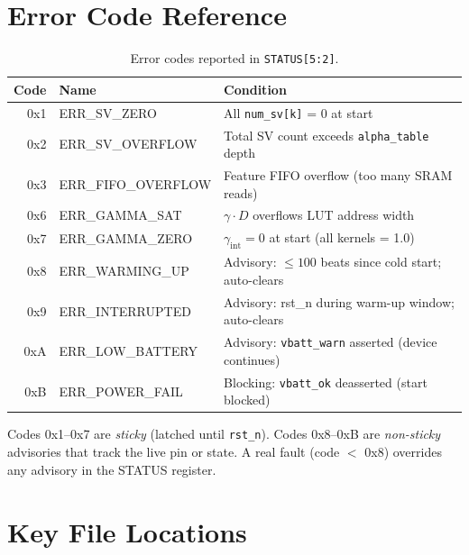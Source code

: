 \documentclass[11pt]{article}
\begin{document}
\section{Error Code Reference}

\begin{table}[H]
  \centering
  \caption{Error codes reported in \texttt{STATUS[5:2]}.}
  \label{tab:errcodes}
  \small
  \begin{tabular}{rll}
    \toprule
    Code & Name & Condition \\
    \midrule
    0x1 & ERR\_SV\_ZERO     & All \texttt{num\_sv[k]} = 0 at start \\
    0x2 & ERR\_SV\_OVERFLOW  & Total SV count exceeds \texttt{alpha\_table} depth \\
    0x3 & ERR\_FIFO\_OVERFLOW & Feature FIFO overflow (too many SRAM reads) \\
    0x6 & ERR\_GAMMA\_SAT   & $\gamma \cdot D$ overflows LUT address width \\
    0x7 & ERR\_GAMMA\_ZERO  & $\gamma_{\mathrm{int}} = 0$ at start (all kernels = 1.0) \\
    0x8 & ERR\_WARMING\_UP  & Advisory: $\le 100$ beats since cold start; auto-clears \\
    0x9 & ERR\_INTERRUPTED  & Advisory: rst\_n during warm-up window; auto-clears \\
    0xA & ERR\_LOW\_BATTERY & Advisory: \texttt{vbatt\_warn} asserted (device continues) \\
    0xB & ERR\_POWER\_FAIL  & Blocking: \texttt{vbatt\_ok} deasserted (start blocked) \\
    \bottomrule
  \end{tabular}
\end{table}

Codes 0x1--0x7 are \emph{sticky} (latched until \texttt{rst\_n}).  Codes 0x8--0xB
are \emph{non-sticky} advisories that track the live pin or state.  A real fault
(code $< $ 0x8) overrides any advisory in the STATUS register.

\appendix
\section{Key File Locations}
\end{document}
